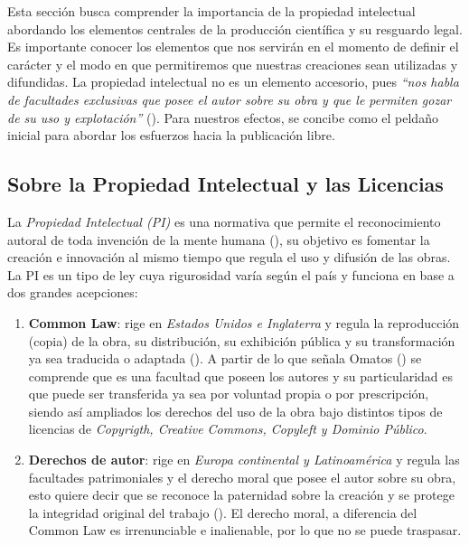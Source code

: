 \documentclass[
  spanish,
  a4paper,
  oneside]{scrbook}
\begin{document}
Esta sección busca comprender la importancia de la propiedad intelectual
abordando los elementos centrales de la producción científica y su
resguardo legal. Es importante conocer los elementos que nos servirán en
el momento de definir el carácter y el modo en que permitiremos que
nuestras creaciones sean utilizadas y difundidas. La propiedad
intelectual no es un elemento accesorio, pues \emph{``nos habla de
facultades exclusivas que posee el autor sobre su obra y que le permiten
gozar de su uso y explotación''}
(). Para nuestros
efectos, se concibe como el peldaño inicial para abordar los esfuerzos
hacia la publicación libre.

\subsection{Sobre la Propiedad Intelectual y las
Licencias}\label{sobre-la-propiedad-intelectual-y-las-licencias}

La \emph{Propiedad Intelectual (PI)} es una normativa que permite el
reconocimiento autoral de toda invención de la mente humana
(), su objetivo es fomentar la
creación e innovación al mismo tiempo que regula el uso y difusión de
las obras. La PI es un tipo de ley cuya rigurosidad varía según el país
y funciona en base a dos grandes acepciones:

\begin{enumerate}
\def\labelenumi{\arabic{enumi}.}
\item
  \textbf{Common Law}: rige en \emph{Estados Unidos e Inglaterra} y
  regula la reproducción (copia) de la obra, su distribución, su
  exhibición pública y su transformación ya sea traducida o adaptada
  (). A partir de
  lo que señala Omatos () se
  comprende que es una facultad que poseen los autores y su
  particularidad es que puede ser transferida ya sea por voluntad propia
  o por prescripción, siendo así ampliados los derechos del uso de la
  obra bajo distintos tipos de licencias de \emph{Copyrigth, Creative
  Commons, Copyleft y Dominio Público}.
\item
  \textbf{Derechos de autor}: rige en \emph{Europa continental y
  Latinoamérica} y regula las facultades patrimoniales y el derecho
  moral que posee el autor sobre su obra, esto quiere decir que se
  reconoce la paternidad sobre la creación y se protege la integridad
  original del trabajo (). El derecho moral, a diferencia del Common Law es irrenunciable
  e inalienable, por lo que no se puede traspasar.
\end{enumerate}
\end{document}
